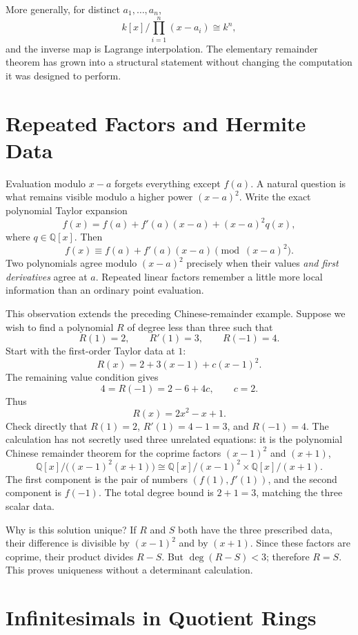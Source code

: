 More generally, for distinct \(a_1,\ldots,a_n\),
\[
  k[x]/\prod_{i=1}^n(x-a_i)
  \cong k^n,
\]
and the inverse map is Lagrange interpolation.  The elementary remainder theorem has grown into a structural statement without changing the computation it was designed to perform.

\section{Repeated Factors and Hermite Data}

Evaluation modulo $x-a$ forgets everything except $f(a)$. A natural question is what remains visible modulo a higher power $(x-a)^2$. Write the exact polynomial Taylor expansion
\[
 f(x)=f(a)+f'(a)(x-a)+(x-a)^2q(x),
\]
where $q\in\mathbb Q[x]$. Then
\[
 \boxed{f(x)\equiv f(a)+f'(a)(x-a)
                  \pmod{(x-a)^2}.}
\]
Two polynomials agree modulo $(x-a)^2$ precisely when their values \emph{and first derivatives} agree at $a$. Repeated linear factors remember a little more local information than an ordinary point evaluation.

This observation extends the preceding Chinese-remainder example. Suppose we wish to find a polynomial $R$ of degree less than three such that
\[
 R(1)=2,\qquad R'(1)=3,\qquad R(-1)=4.
\]
Start with the first-order Taylor data at $1$:
\[
 R(x)=2+3(x-1)+c(x-1)^2.
\]
The remaining value condition gives
\[
 4=R(-1)=2-6+4c,
 \qquad c=2.
\]
Thus
\[
 \boxed{R(x)=2x^2-x+1.}
\]
Check directly that $R(1)=2$, $R'(1)=4-1=3$, and $R(-1)=4$. The calculation has not secretly used three unrelated equations: it is the polynomial Chinese remainder theorem for the coprime factors $(x-1)^2$ and $(x+1)$,
\[
 \mathbb Q[x]/\bigl((x-1)^2(x+1)\bigr)
 \cong
 \mathbb Q[x]/(x-1)^2\times\mathbb Q[x]/(x+1).
\]
The first component is the pair of numbers $(f(1),f'(1))$, and the second component is $f(-1)$. The total degree bound is $2+1=3$, matching the three scalar data.

Why is this solution unique? If $R$ and $S$ both have the three prescribed data, their difference is divisible by $(x-1)^2$ and by $(x+1)$. Since these factors are coprime, their product divides $R-S$. But $\deg(R-S)<3$; therefore $R=S$. This proves uniqueness without a determinant calculation.

\section{Infinitesimals in Quotient Rings}

